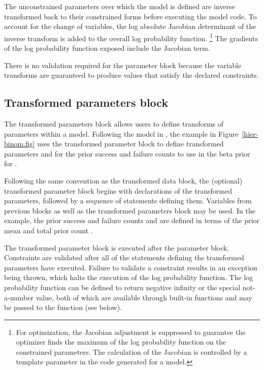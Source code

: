 \documentclass[article]{jss}
\begin{document}
The unconstrained parameters over which the model is defined are
inverse transformed back to their constrained forms before executing
the model code.  To account for the change of variables, the log
absolute Jacobian determinant of the inverse transform is added to the
overall log probability function.%
%
\footnote{For optimization, the Jacobian adjustment is suppressed to
  guarantee the optimizer finds the maximum of the log probability
  function on the constrained parameters.  The calculation of the
  Jacobian is controlled by a template parameter in the 
  code generated for a model.}
%
The gradients of the log probability function exposed include the
Jacobian term.  

There is no validation required for the parameter block because the
variable transforms are guaranteed to produce values that satisfy the
declared constraints.


\subsection{Transformed parameters block}

The transformed parameters block allows users to define transforms of
parameters within a model.  Following the model in
\citep{GelmanEtAl:2013}, the example in Figure~\ref{hier-binom.fig}
uses the transformed parameter block to define transformed parameters
 and  for the prior success and failure counts
to use in the beta prior for .  

Following the same convention as the transformed data block, the
(optional) transformed parameter block begins with declarations of the
transformed parameters, followed by a sequence of statements defining
them.  Variables from previous blocks as well as the transformed
parameters block may be used.  In the example, the prior success and
failure counts  and  are defined in terms of
the prior mean  and total prior count .

The transformed parameter block is executed after the parameter block.
Constraints are validated after all of the statements defining the
transformed parameters have executed.  Failure to validate a
constraint results in an exception being thrown, which halts the
execution of the log probability function.  The log probability
function can be defined to return negative infinity or the special
not-a-number value, both of which are available through built-in
functions and may be passed to the 
function (see below).
\end{document}
